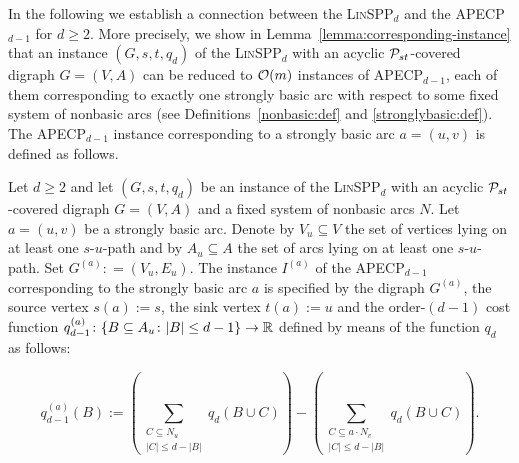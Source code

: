 In the following we establish a connection between the \textsc{Lin}SPP$_d$ and the APECP$_{d-1}$ for $d\ge 2$. More precisely, we show in Lemma~\ref{lemma:corresponding-instance}  that    an   instance $(G,s,t,q_d)$ of the  \textsc{Lin}SPP$_d$ with an acyclic  $\mathcal{P}_{st}$-covered digraph $G=(V,A)$ can  be reduced  to $\mathcal{O}(m)$ instances of APECP$_{d-1}$, each of them corresponding to exactly one strongly basic arc with respect to some fixed system of nonbasic arcs (see Definitions~\ref{nonbasic:def} and \ref{stronglybasic:def}).  The  APECP$_{d-1}$ instance corresponding to a strongly basic arc  $a = (u, v)$ is defined as follows.
\begin{definition}
\label{def:corresponding-instance}
Let $d \geq 2$ and let  $(G, s,t, q_d)$ be an instance of the \textsc{Lin}SPP$_d$ with an acyclic  $\mathcal{P}_{st}$-covered digraph $G=(V,A)$ and a fixed system of nonbasic arcs  $N$.   
Let $a=(u,v)$ be a  strongly basic arc. Denote by   $V_u\subseteq V$  the set of vertices  lying on at least one $s$-$u$-path and  by  $A_u\subseteq A$  the set of arcs lying on at least one $s$-$u$-path. Set  $G^{(a)}: = (V_u, E_u)$. 
    The   instance $I^{(a)}$ of the APECP$_{d-1}$ corresponding to the strongly basic arc $a$ is specified 
    by the digraph $G^{(a)}$, the source vertex $s(a):=s$, the sink vertex $t(a):= u$ and the  order-$(d-1)$  cost function   $q_{d-1}^{(a)}\colon \{ B \subseteq A_u\colon  |B| \leq d-1\} \to \mathbb{R}$  defined by means of the function $q_d$ as follows:  \begin{comment}
  The instance $I^{(a)}$ of the APECP$_{d-1}$ corresponding to the strongly basic arc $a=(u,v)$ takes as input   the digraph $G^{(a)} = (V_u, E_u)$ with  source vertex $s' = s$,  sink vertex $t' = u$, where 
 $V_u$ is the set of vertices in $V$ lying on at least one $s$-$u$-path and $A_u$  is the set of arcs in $A$ lying on at least one $s$-$u$-path.
 
  The  order-$(d-1)$  cost function   $q_{d-1}^{(a)}\colon \{ B \subseteq A_u\colon  |B| \leq d-1\} \to \rz$ is given by
  \end{comment}
    \begin{equation} \label{eq:definition_q_e}
        q_{d-1}^{(a)}(B) := \left(\sum_{\substack{C \subseteq N_u\\ |C| \leq d - |B|}}q_d(B \cup C) \right) - \left( \sum_{\substack{C \subseteq a \cdot N_v\\ |C| \leq d - |B|}}q_d(B \cup C) \right). 
    \end{equation}
\end{definition}

